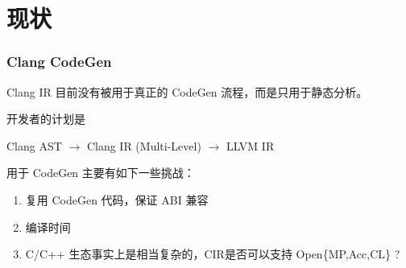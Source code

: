 \section{现状}

\begin{frame}
    \frametitle{Clang CodeGen}

    Clang IR 目前没有被用于真正的 CodeGen 流程，而是只用于静态分析。

    开发者的计划是
    \begin{center}
        Clang AST $\rightarrow$ Clang IR (Multi-Level) $\rightarrow$ LLVM IR
    \end{center}

    用于 CodeGen 主要有如下一些挑战：

    \begin{enumerate}
        \item 复用 CodeGen 代码，保证 ABI 兼容
        \item 编译时间
        \item C/C++ 生态事实上是相当复杂的，CIR是否可以支持 Open\{MP,Acc,CL\} ?
    \end{enumerate}
\end{frame}
